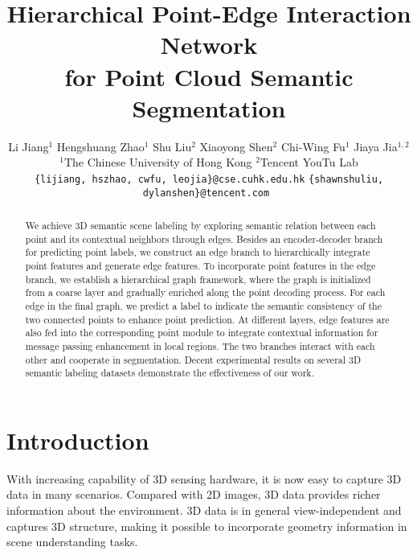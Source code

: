 \documentclass[10pt,twocolumn,letterpaper]{article}
\begin{document}
\title{Hierarchical Point-Edge Interaction Network \\ for Point Cloud Semantic Segmentation}

\author{Li Jiang$^{1}$ \quad Hengshuang Zhao$^{1}$ \quad Shu Liu$^{2}$ \quad Xiaoyong Shen$^{2}$ \quad Chi-Wing Fu$^{1}$ \quad Jiaya Jia$^{1,2}$\\
	$^{1}$The Chinese University of Hong Kong \quad $^{2}$Tencent YouTu Lab\\
	{\tt\small \{lijiang, hszhao, cwfu, leojia\}@cse.cuhk.edu.hk} \quad \tt\small \{shawnshuliu, dylanshen\}@tencent.com
}

\maketitle




\begin{abstract}
We achieve 3D semantic scene labeling by exploring semantic relation between each point and its contextual neighbors through edges. Besides an encoder-decoder branch for predicting point labels, we construct an edge branch to hierarchically integrate point features and generate edge features. To incorporate point features in the edge branch, we establish a hierarchical graph framework, where the graph is initialized from a coarse layer and gradually enriched along the point decoding process. For each edge in the final graph, we predict a label to indicate the semantic consistency of the two connected points to enhance point prediction. At different layers, edge features are also fed into the corresponding point module to integrate contextual information for message passing enhancement in local regions. The two branches interact with each other and cooperate in segmentation. Decent experimental results on several 3D semantic labeling datasets demonstrate the effectiveness of our work. 
\end{abstract}
\vspace{-2mm}

\section{Introduction}
With increasing capability of 3D sensing hardware, it is now easy to capture 3D data in many scenarios. Compared with 2D images, 3D data provides richer information about the environment. 3D data is in general view-independent and captures 3D structure, making it possible to incorporate geometry information in scene understanding tasks.
\end{document}
